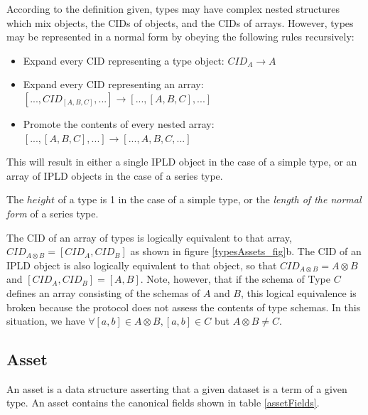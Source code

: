 \documentclass[9pt, oneside]{article}   	%
\begin{document}
\begin{multicols}{2}

According to the definition given, types may have complex nested structures which mix objects, the CIDs of objects, and the CIDs of arrays. However, types may be represented in a normal form by obeying the following rules recursively:

\begin{itemize}
\item Expand every CID representing a type object: $CID_A \rightarrow A$
\item Expand every CID representing an array: $[..., CID_{[A,B,C]}, ...] \rightarrow [..., [A,B,C], ...]$
\item Promote the contents of every nested array: $ [..., [A,B,C], ...] \rightarrow [..., A,B,C, ...]$
\end{itemize}

This will result in either a single IPLD object in the case of a simple type, or an array of IPLD objects in the case of a series type.

The $height$ of a type is 1 in the case of a simple type, or the \textit{length of the normal form} of a series type.

The CID of an array of types is logically equivalent to that array, $CID_{A \otimes B} = [CID_A, CID_B]$ as shown in figure \ref{typesAssets_fig}b. The CID of an IPLD object is also logically equivalent to that object, so that $CID_{A \otimes B} = A \otimes B$ and $[CID_A, CID_B] = [A,B]$. Note, however, that  if the schema of Type $C$ defines an array consisting of the schemas of $A$ and $B$, this logical equivalence is broken because the protocol does not assess the contents of type schemas. In this situation, we have $\forall [a,b] \in A\otimes B,  [a,b] \in C$ but $ A\otimes B \neq C$.

\subsection{Asset}\label{asset}

An asset is a data structure asserting that a given dataset is a term of a given type. An asset contains the canonical fields shown in table \ref{assetFields}.


\end{multicols}
\end{document}
